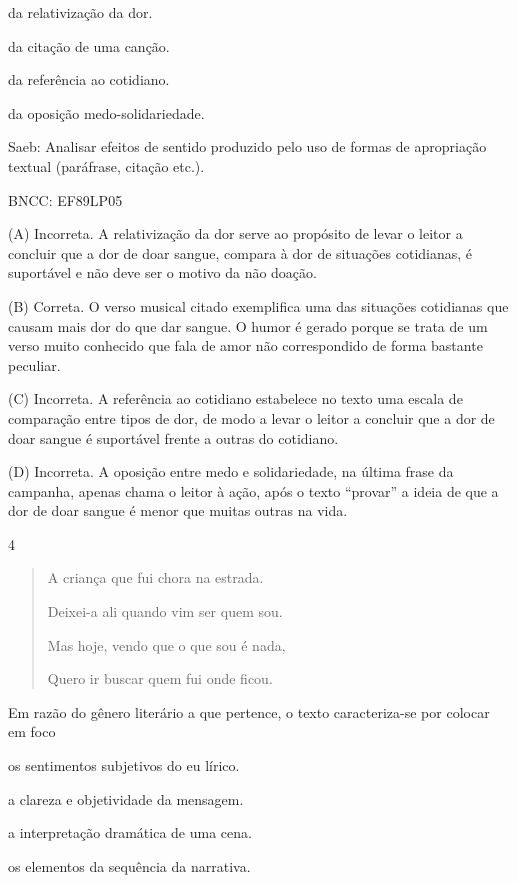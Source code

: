 \begin{escolha}
\item da relativização da dor.
\item da citação de uma canção.
\item da referência ao cotidiano.
\item da oposição medo-solidariedade.
\end{escolha}

Saeb: Analisar efeitos de sentido produzido pelo uso de formas de
apropriação textual (paráfrase, citação etc.).

BNCC: EF89LP05

(A) Incorreta. A relativização da dor serve ao propósito de levar o
leitor a concluir que a dor de doar sangue, compara à dor de situações
cotidianas, é suportável e não deve ser o motivo da não doação.

(B) Correta. O verso musical citado exemplifica uma das situações
cotidianas que causam mais dor do que dar sangue. O humor é gerado
porque se trata de um verso muito conhecido que fala de amor não
correspondido de forma bastante peculiar.

(C) Incorreta. A referência ao cotidiano estabelece no texto uma escala
de comparação entre tipos de dor, de modo a levar o leitor a concluir
que a dor de doar sangue é suportável frente a outras do cotidiano.

(D) Incorreta. A oposição entre medo e solidariedade, na última frase da
campanha, apenas chama o leitor à ação, após o texto ``provar'' a ideia
de que a dor de doar sangue é menor que muitas outras na vida.

\num{4}

\begin{quote}
A criança que fui chora na estrada.

Deixei-a ali quando vim ser quem sou.

Mas hoje, vendo que o que sou é nada,

Quero ir buscar quem fui onde ficou.
\end{quote}


Em razão do gênero literário a que pertence, o texto caracteriza-se por
colocar em foco

\begin{escolha}
\item os sentimentos subjetivos do eu lírico.

\item a clareza e objetividade da mensagem.

\item a interpretação dramática de uma cena.

\item os elementos da sequência da narrativa.
\end{escolha}

